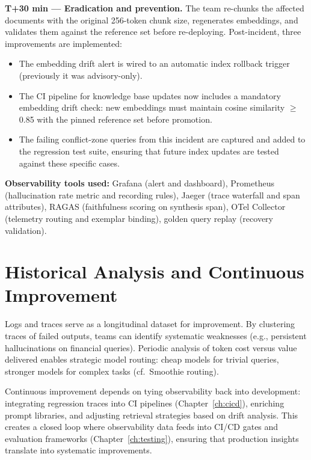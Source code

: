 {\medskip
\noindent\textbf{T+30 min --- Eradication and prevention.}
The team re-chunks the affected documents with the original 256-token chunk size, regenerates embeddings, and validates them against the reference set before re-deploying. Post-incident, three improvements are implemented:
\begin{itemize}[leftmargin=1.5em, itemsep=2pt]
    \item The embedding drift alert is wired to an automatic index rollback trigger (previously it was advisory-only).
    \item The CI pipeline for knowledge base updates now includes a mandatory embedding drift check: new embeddings must maintain cosine similarity $\geq$ 0.85 with the pinned reference set before promotion.
    \item The failing conflict-zone queries from this incident are captured and added to the regression test suite, ensuring that future index updates are tested against these specific cases.
\end{itemize}

\medskip
\noindent\textbf{Observability tools used:} Grafana (alert and dashboard), Prometheus (hallucination rate metric and recording rules), Jaeger (trace waterfall and span attributes), RAGAS (faithfulness scoring on synthesis span), OTel Collector (telemetry routing and exemplar binding), golden query replay (recovery validation).
}

\section{Historical Analysis and Continuous Improvement}
\label{sec:historical-analysis-and-continuous-improvement}
Logs and traces serve as a longitudinal dataset for improvement. By clustering traces of failed outputs, teams can identify systematic weaknesses (e.g., persistent hallucinations on financial queries). Periodic analysis of token cost versus value delivered enables strategic model routing: cheap models for trivial queries, stronger models for complex tasks (cf.\ Smoothie routing).

Continuous improvement depends on tying observability back into development: integrating regression traces into CI pipelines (Chapter~\ref{ch:cicd}), enriching prompt libraries, and adjusting retrieval strategies based on drift analysis. This creates a closed loop where observability data feeds into CI/CD gates and evaluation frameworks (Chapter~\ref{ch:testing}), ensuring that production insights translate into systematic improvements.

